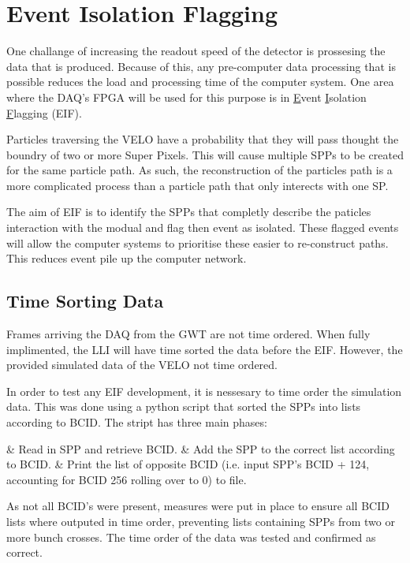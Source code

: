 \section{Event Isolation Flagging}
	
	One challange of increasing the readout speed of the detector is prossesing the data that is produced.
	Because of this, any pre-computer data processing that is possible reduces the load and processing time of the computer system.
	One area where the DAQ's FPGA will be used for this purpose is in \underline{E}vent \underline{I}solation \underline{F}lagging (EIF).
	\par
	Particles traversing the VELO have a probability that they will pass thought the boundry of two or more Super Pixels.
	This will cause multiple SPPs to be created for the same particle path.
	As such, the reconstruction of the particles path is a more complicated process than a particle path that only interects with one SP.
	\par
	The aim of EIF is to identify the SPPs that completly describe the paticles interaction with the modual and flag then event as isolated.
	These flagged events will allow the computer systems to prioritise these easier to re-construct paths.
	This reduces event pile up the computer network.

	\subsection{Time Sorting Data}

		Frames arriving the DAQ from the GWT are not time ordered.
		When fully implimented, the LLI will have time sorted the data before the EIF.
		However, the provided simulated data of the VELO not time ordered.
		\par
		In order to test any EIF development, it is nessesary to time order the simulation data.
		This was done using a python script that sorted the SPPs into lists according to BCID.
		The stript has three main phases:

		\begin{easylist}
			& Read in SPP and retrieve BCID.
			& Add the SPP to the correct list according to BCID.
			& Print the list of opposite BCID (i.e. input SPP's BCID + 124, accounting for BCID 256 rolling over to 0) to file.
		\end{easylist}

		As not all BCID's were present, measures were put in place to ensure all BCID lists where outputed in time order, preventing lists containing SPPs from two or more bunch crosses. The time order of the data was tested and confirmed as correct.

